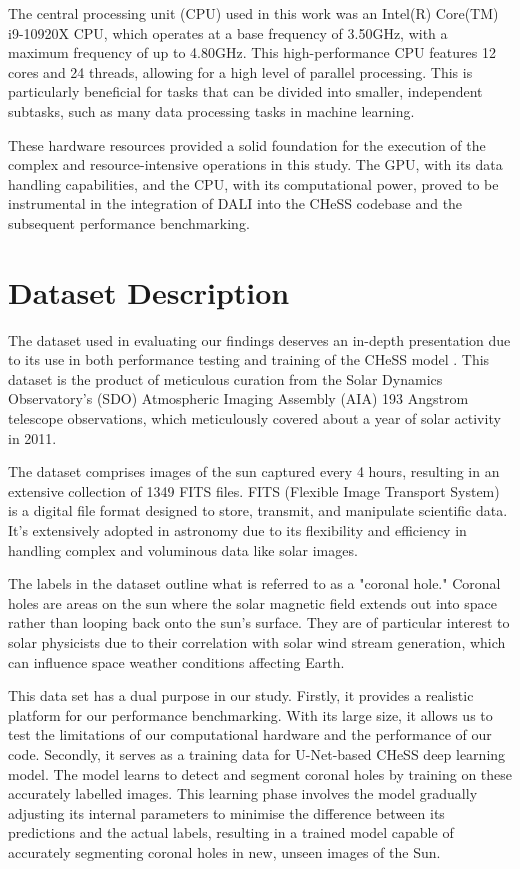 \documentclass[licencjacka,en]{pracamgr}
\begin{document}
The central processing unit (CPU) used in this work was an Intel(R) Core(TM) i9-10920X CPU, which operates at a base frequency of 3.50GHz, with a maximum frequency of up to 4.80GHz. This high-performance CPU features 12 cores and 24 threads, allowing for a high level of parallel processing. This is particularly beneficial for tasks that can be divided into smaller, independent subtasks, such as many data processing tasks in machine learning.

These hardware resources provided a solid foundation for the execution of the complex and resource-intensive operations in this study. The GPU, with its data handling capabilities, and the CPU, with its computational power, proved to be instrumental in the integration of DALI into the CHeSS codebase and the subsequent performance benchmarking.


\section{\label{dataset}Dataset Description}

The dataset used in evaluating our findings \cite{sdo} deserves an in-depth presentation due to its use in both performance testing and training of the CHeSS model \cite{CHeSS}. This dataset is the product of meticulous curation from the Solar Dynamics Observatory's (SDO) Atmospheric Imaging Assembly (AIA) 193 Angstrom telescope observations, which meticulously covered about a year of solar activity in 2011.

The dataset comprises images of the sun captured every 4 hours, resulting in an extensive collection of 1349 FITS files. FITS (Flexible Image Transport System) is a digital file format designed to store, transmit, and manipulate scientific data. It's extensively adopted in astronomy due to its flexibility and efficiency in handling complex and voluminous data like solar images. 

The labels in the dataset outline what is referred to as a "coronal hole." Coronal holes are areas on the sun where the solar magnetic field extends out into space rather than looping back onto the sun's surface. They are of particular interest to solar physicists due to their correlation with solar wind stream generation, which can influence space weather conditions affecting Earth.

This data set has a dual purpose in our study. Firstly, it provides a realistic platform for our performance benchmarking. With its large size, it allows us to test the limitations of our computational hardware and the performance of our code. Secondly, it serves as a training data for U-Net-based CHeSS deep learning model\cite{CHeSS}. The model learns to detect and segment coronal holes by training on these accurately labelled images. This learning phase involves the model gradually adjusting its internal parameters to minimise the difference between its predictions and the actual labels, resulting in a trained model capable of accurately segmenting coronal holes in new, unseen images of the Sun.
\end{document}
